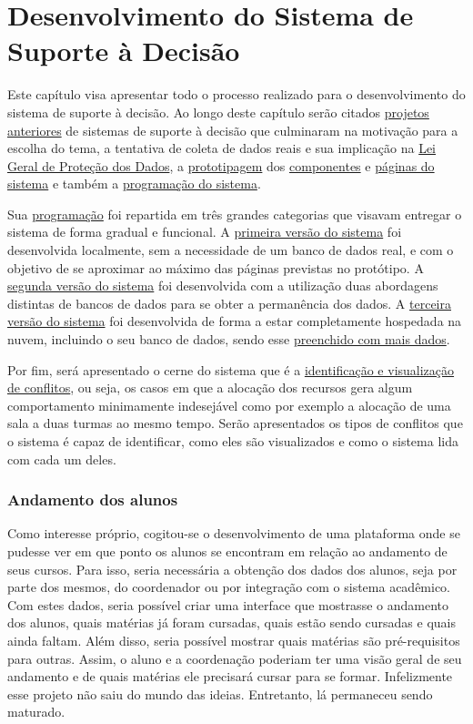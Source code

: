 \chapter{Desenvolvimento do Sistema de Suporte à Decisão} \label{chap:desenvolvimento} %

Este capítulo visa apresentar todo o processo realizado para o desenvolvimento do sistema de suporte à decisão. Ao longo deste capítulo serão citados \hyperref[sec:projetos]{projetos anteriores} de sistemas de suporte à decisão que culminaram na motivação para a escolha do tema, a tentativa de coleta de dados reais e sua implicação na \hyperref[sec:LGPD]{Lei Geral de Proteção dos Dados}, a \hyperref[sec:prototipagem]{prototipagem} dos \hyperref[subsec:componentes]{componentes} e \hyperref[subsec:páginas]{páginas do sistema} e também a \hyperref[sec:programação]{programação do sistema}.

Sua \hyperref[sec:programação]{programação} foi repartida em três grandes categorias que visavam entregar o sistema de forma gradual e funcional. A \hyperref[subsec:MVP1]{primeira versão do sistema} foi desenvolvida localmente, sem a necessidade de um banco de dados real, e com o objetivo de se aproximar ao máximo das páginas previstas no protótipo. A \hyperref[subsec:MVP2]{segunda versão do sistema} foi desenvolvida com a utilização duas abordagens distintas de bancos de dados para se obter a permanência dos dados. A \hyperref[subsec:MVP3]{terceira versão do sistema} foi desenvolvida de forma a estar completamente hospedada na nuvem, incluindo o seu banco de dados, sendo esse \hyperref[par:preenchimento]{preenchido com mais dados}.

Por fim, será apresentado o cerne do sistema que é a \hyperref[sec:conflitos]{identificação e visualização de conflitos}, ou seja, os casos em que a alocação dos recursos gera algum comportamento minimamente indesejável como por exemplo a alocação de uma sala a duas turmas ao mesmo tempo. Serão apresentados os tipos de conflitos que o sistema é capaz de identificar, como eles são visualizados e como o sistema lida com cada um deles.

\subsection{Andamento dos alunos} %

Como interesse próprio, cogitou-se o desenvolvimento de uma plataforma onde se pudesse ver em que ponto os alunos se encontram em relação ao andamento de seus cursos. Para isso, seria necessária a obtenção dos dados dos alunos, seja por parte dos mesmos, do coordenador ou por integração com o sistema acadêmico. Com estes dados, seria possível criar uma interface que mostrasse o andamento dos alunos, quais matérias já foram cursadas, quais estão sendo cursadas e quais ainda faltam. Além disso, seria possível mostrar quais matérias são pré-requisitos para outras. Assim, o aluno e a coordenação poderiam ter uma visão geral de seu andamento e de quais matérias ele precisará cursar para se formar. Infelizmente esse projeto não saiu do mundo das ideias. Entretanto, lá permaneceu sendo maturado.

